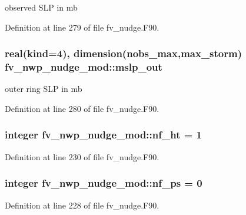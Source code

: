 observed S\-L\-P in mb 



Definition at line 279 of file fv\-\_\-nudge.\-F90.

\subsubsection[{mslp\-\_\-out}]{\setlength{\rightskip}{0pt plus 5cm}real(kind=4), dimension({\bf nobs\-\_\-max},{\bf max\-\_\-storm}) fv\-\_\-nwp\-\_\-nudge\-\_\-mod\-::mslp\-\_\-out\hspace{0.3cm}{\ttfamily [private]}}\label{classfv__nwp__nudge__mod_ad0231a73a4870ec8743ecd19e7181b11}


outer ring S\-L\-P in mb 



Definition at line 280 of file fv\-\_\-nudge.\-F90.

\subsubsection[{nf\-\_\-ht}]{\setlength{\rightskip}{0pt plus 5cm}integer fv\-\_\-nwp\-\_\-nudge\-\_\-mod\-::nf\-\_\-ht = 1\hspace{0.3cm}{\ttfamily [private]}}\label{classfv__nwp__nudge__mod_af093b08be6222c05893da2a51a656d68}


Definition at line 230 of file fv\-\_\-nudge.\-F90.

\subsubsection[{nf\-\_\-ps}]{\setlength{\rightskip}{0pt plus 5cm}integer fv\-\_\-nwp\-\_\-nudge\-\_\-mod\-::nf\-\_\-ps = 0\hspace{0.3cm}{\ttfamily [private]}}\label{classfv__nwp__nudge__mod_a3482c6b80161fc5cbb0464c8ce29a44b}


Definition at line 228 of file fv\-\_\-nudge.\-F90.

